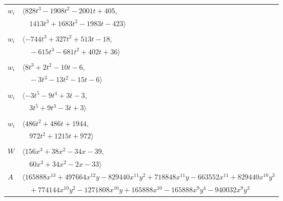\documentclass[11pt]{article}
\begin{document}
\begin{longtable}{@{}ll@{}}
$w_i$ & $\langle 828t^{3}-1908t^{2}-2001t+405,$\\
 & $\quad 1413t^{3}+1683t^{2}-1983t-423\rangle$\\
\addlinespace[2pt]
\multicolumn{2}{@{}p{0.97\textwidth}@{}}{$i=59$, $D_i=1$, $\rho_{ij}$: $2{:}1, \allowbreak 3{:}1, \allowbreak 8{:}2, \allowbreak 13{:}2, \allowbreak 23{:}1, \allowbreak 42{:}1, \allowbreak 51{:}2, \allowbreak 74{:}2$}\\
$w_i$ & $\langle -744t^{3}+327t^{2}+513t-18,$\\
 & $\quad -615t^{3}-681t^{2}+402t+36\rangle$\\
\addlinespace[2pt]
\multicolumn{2}{@{}p{0.97\textwidth}@{}}{$i=60$, $D_i=3$, $\rho_{ij}$: $2{:}2, \allowbreak 21{:}2, \allowbreak 25{:}2, \allowbreak 38{:}2, \allowbreak 58{:}1, \allowbreak 66{:}2$}\\
$w_i$ & $\langle 8t^{3}+2t^{2}-10t-6,$\\
 & $\quad -3t^{3}-13t^{2}-15t-6\rangle$\\
\addlinespace[2pt]
\multicolumn{2}{@{}p{0.97\textwidth}@{}}{$i=61$, $D_i=6$, $\rho_{ij}$: $1{:}1, \allowbreak 10{:}1, \allowbreak 13{:}2, \allowbreak 21{:}1, \allowbreak 29{:}2, \allowbreak 38{:}2, \allowbreak 43{:}1, \allowbreak 49{:}2$}\\
$w_i$ & $\langle -3t^{5}-9t^{4}+3t-3,$\\
 & $\quad 3t^{5}+9t^{3}-3t+3\rangle$\\
\addlinespace[2pt]
\multicolumn{2}{@{}p{0.97\textwidth}@{}}{$i=62$, $D_i=18$, $e_i=1$, $\rho_{ij}$: $0{:}1, \allowbreak 2{:}1, \allowbreak 17{:}1, \allowbreak 32{:}2, \allowbreak 34{:}1, \allowbreak 35{:}2, \allowbreak 37{:}2, \allowbreak 71{:}1$}\\
$w_i$ & $\langle 486t^{2}+486t+1944,$\\
 & $\quad 972t^{2}+1215t+972\rangle$\\
\addlinespace[2pt]
\multicolumn{2}{@{}p{0.97\textwidth}@{}}{$i=63$, $D_i=24$, $\rho_{ij}$: $7{:}1, \allowbreak 9{:}1, \allowbreak 14{:}1, \allowbreak 22{:}1, \allowbreak 33{:}1, \allowbreak 40{:}1, \allowbreak 53{:}1, \allowbreak 55{:}2, \allowbreak 66{:}1, \allowbreak 68{:}1, \allowbreak 70{:}2$}\\
$W$ & $\langle 156x^{3}+38x^{2}-34x-39,$\\
 & $\quad 60x^{3}+34x^{2}-2x-33\rangle$\\
$A$ & $\langle 165888x^{13}+497664x^{12}y-829440x^{11}y^{2}+718848x^{11}y-663552x^{11}+829440x^{10}y^{3}$\\
 & $\quad +774144x^{10}y^{2}-1271808x^{10}y+165888x^{10}-165888x^{9}y^{4}-940032x^{9}y^{3}$\\

\end{longtable}
\end{document}
